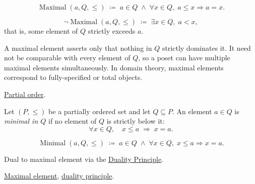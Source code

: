 \begin{remark*}
\[
\operatorname{Maximal}(a, Q, \leq)
\;\coloneqq\;
a \in Q \;\land\; \forall x \in Q,\; a \leq x \Rightarrow a = x.
\]
\end{remark*}

\begin{remark*}
\[
\neg\operatorname{Maximal}(a, Q, \leq)
\;\coloneqq\;
\exists x \in Q,\; a < x,
\]
that is, some element of $Q$ strictly exceeds $a$.
\end{remark*}

\begin{remark*}[Interpretation]
A maximal element asserts only that nothing in $Q$ strictly dominates it.
It need not be comparable with every element of $Q$, so a poset can have
multiple maximal elements simultaneously.  In domain theory, maximal
elements correspond to fully-specified or total objects.
\end{remark*}

\begin{remark*}[Dependencies]
\hyperref[def:partial-order]{Partial order}.
\end{remark*}


\begin{definition}
\label{def:minimal-element}
Let $(P, \leq)$ be a partially ordered set and let $Q \subseteq P$.  An
element $a \in Q$ is \emph{minimal in $Q$} if no element of $Q$ is
strictly below it:
\[
\forall x \in Q, \quad x \leq a \;\Longrightarrow\; x = a.
\]
\end{definition}

\begin{remark*}
\[
\operatorname{Minimal}(a, Q, \leq)
\;\coloneqq\;
a \in Q \;\land\; \forall x \in Q,\; x \leq a \Rightarrow x = a.
\]
\end{remark*}

\begin{remark*}[Interpretation]
Dual to maximal element via the
\hyperref[prop:duality-principle]{Duality Principle}.
\end{remark*}

\begin{remark*}[Dependencies]
\hyperref[def:maximal-element]{Maximal element},
\hyperref[prop:duality-principle]{duality principle}.
\end{remark*}

